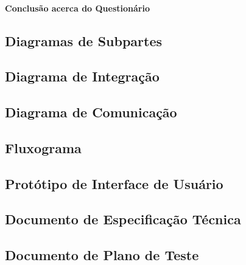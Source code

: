 \paragraph{Conclusão acerca do Questionário}

\subsection{Diagramas de Subpartes}
\subsection{Diagrama de Integração}
\subsection{Diagrama de Comunicação}
\subsection{Fluxograma}
\subsection{Protótipo de Interface de Usuário}
\subsection{Documento de Especificação Técnica}
\subsection{Documento de Plano de Teste}

